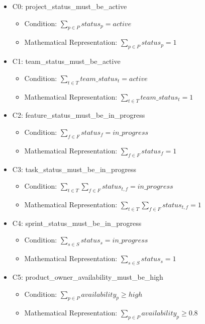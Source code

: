 \documentclass{article}
\begin{document}
\begin{itemize}
    \item C0: project\_status\_must\_be\_active
        \begin{itemize}
            \item Condition: $\sum_{p \in P} status_p = active$
            \item Mathematical Representation: $\sum_{p \in P} status_p = 1$
        \end{itemize}
    \item C1: team\_status\_must\_be\_active
        \begin{itemize}
            \item Condition: $\sum_{t \in T} team\_status_t = active$
            \item Mathematical Representation: $\sum_{t \in T} team\_status_t = 1$
        \end{itemize}
    \item C2: feature\_status\_must\_be\_in\_progress
        \begin{itemize}
            \item Condition: $\sum_{f \in F} status_f = in\_progress$
            \item Mathematical Representation: $\sum_{f \in F} status_f = 1$
        \end{itemize}
    \item C3: task\_status\_must\_be\_in\_progress
        \begin{itemize}
            \item Condition: $\sum_{t \in T} \sum_{f \in F} status_{t,f} = in\_progress$
            \item Mathematical Representation: $\sum_{t \in T} \sum_{f \in F} status_{t,f} = 1$
        \end{itemize}
    \item C4: sprint\_status\_must\_be\_in\_progress
        \begin{itemize}
            \item Condition: $\sum_{s \in S} status_s = in\_progress$
            \item Mathematical Representation: $\sum_{s \in S} status_s = 1$
        \end{itemize}
    \item C5: product\_owner\_availability\_must\_be\_high
        \begin{itemize}
            \item Condition: $\sum_{p \in P} availability_p \geq high$
            \item Mathematical Representation: $\sum_{p \in P} availability_p \geq 0.8$

\end{itemize}
\end{itemize}
\end{document}
